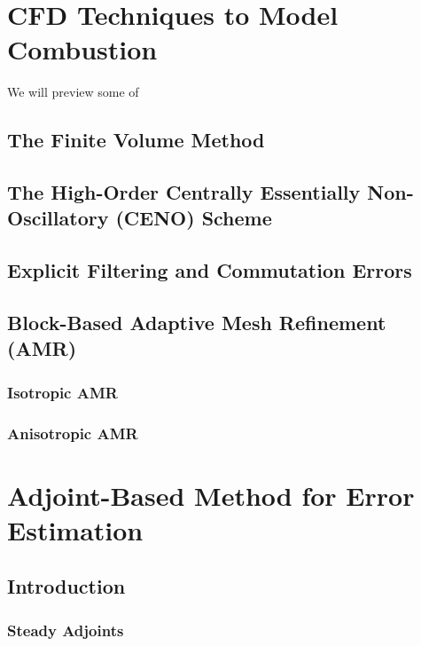 \documentclass[titlepage,11pt,letterpaper]{article}
\begin{document}
\section{CFD Techniques to Model Combustion}

\noindent We will preview some of\\
\subsection{The Finite Volume Method}
\subsection{The High-Order Centrally Essentially Non-Oscillatory (CENO) Scheme}
\subsection{Explicit Filtering and Commutation Errors}
\subsection{Block-Based Adaptive Mesh Refinement (AMR)}
\subsubsection{Isotropic AMR}
\subsubsection{Anisotropic AMR}

\newpage
\section{Adjoint-Based Method for Error Estimation}
\subsection{Introduction}
\subsubsection{Steady Adjoints}
\end{document}
